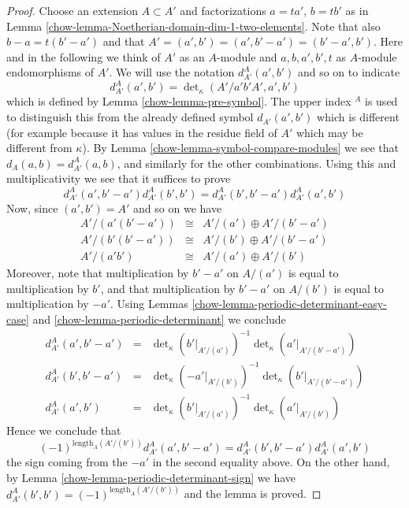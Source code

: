 \begin{proof}
\medskip\noindent
Choose an extension $A \subset A'$ and factorizations
$a = ta'$, $b = tb'$ as in
Lemma \ref{chow-lemma-Noetherian-domain-dim-1-two-elements}.
Note that also $b - a = t(b' - a')$ and that
$A' = (a', b') = (a', b' - a') = (b' - a', b')$.
Here and in the following we think of $A'$ as an $A$-module and
$a, b, a', b', t$ as $A$-module endomorphisms of $A'$.
We will use the notation $d^A_{A'}(a', b')$ and so on to indicate
$$
d^A_{A'}(a', b')
=
\det\nolimits_\kappa(A'/a'b'A', a', b')
$$
which is defined by Lemma \ref{chow-lemma-pre-symbol}. The upper index ${}^A$
is used to distinguish this from the already defined symbol
$d_{A'}(a', b')$ which is different (for example because it has values
in the residue field of $A'$ which may be different from $\kappa$).
By Lemma \ref{chow-lemma-symbol-compare-modules} we see that
$d_A(a, b) = d^A_{A'}(a, b)$,
and similarly for the other combinations.
Using this and multiplicativity we see that it suffices to prove
$$
d^A_{A'}(a', b' - a') d^A_{A'}(b', b')
=
d^A_{A'}(b', b' - a') d^A_{A'}(a', b')
$$
Now, since $(a', b') = A'$ and so on we have
$$
\begin{matrix}
A'/(a'(b' - a')) & \cong & A'/(a') \oplus A'/(b' - a') \\
A'/(b'(b' - a')) & \cong & A'/(b') \oplus A'/(b' - a') \\
A'/(a'b') & \cong & A'/(a') \oplus A'/(b')
\end{matrix}
$$
Moreover, note that multiplication by $b' - a'$ on
$A/(a')$ is equal to multiplication by $b'$, and that
multiplication by $b' - a'$ on $A/(b')$ is equal to multiplication by $-a'$.
Using Lemmas
\ref{chow-lemma-periodic-determinant-easy-case} and
\ref{chow-lemma-periodic-determinant}
we conclude
$$
\begin{matrix}
d^A_{A'}(a', b' - a') & = &
\det\nolimits_\kappa(b'|_{A'/(a')})^{-1}
\det\nolimits_\kappa(a'|_{A'/(b' - a')}) \\
d^A_{A'}(b', b' - a') & = &
\det\nolimits_\kappa(-a'|_{A'/(b')})^{-1}
\det\nolimits_\kappa(b'|_{A'/(b' - a')}) \\
d^A_{A'}(a', b') & = &
\det\nolimits_\kappa(b'|_{A'/(a')})^{-1}
\det\nolimits_\kappa(a'|_{A'/(b')})
\end{matrix}
$$
Hence we conclude that
$$
(-1)^{\text{length}_A(A'/(b'))}
d^A_{A'}(a', b' - a')
=
d^A_{A'}(b', b' - a') d^A_{A'}(a', b')
$$
the sign coming from the $-a'$ in the second equality above.
On the other hand, by Lemma \ref{chow-lemma-periodic-determinant-sign} we have
$d^A_{A'}(b', b') = (-1)^{\text{length}_A(A'/(b'))}$ and the lemma
is proved.
\end{proof}

